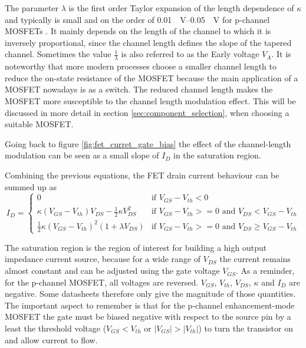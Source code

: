 The parameter $\lambda$ is the first order Taylor expansion of the length dependence of $\kappa$ and typically is small and on the order of \qtyrange[range-units = single, per-mode=power]{0.01}{0.05}{\per \volt} for p-channel MOSFETs \citep[p. 23]{mosfet_flicker_noise}. It mainly depends on the length of the channel to which it is inversely proportional, since the channel length defines the slope of the tapered channel. Sometimes the value $\frac{1}{\lambda}$ is also referred to as the Early voltage $V_A$. It is noteworthy that more modern processes choose a smaller channel length to reduce the on-state resistance of the MOSFET because the main application of a MOSFET nowadays is as a switch. The reduced channel length makes the MOSFET more susceptible to the channel length modulation effect. This will be discussed in more detail in section \ref{sec:component_selection}, when choosing a suitable MOSFET.

Going back to figure \ref{fig:fet_curret_gate_bias} the effect of the channel-length modulation can be seen as a small slope of $I_D$ in the saturation region.

Combining the previous equations, the FET drain current behaviour can be summed up as
\begin{equation}
    I_D = \begin{cases}
        0 & \text{if } V_{GS} - V_{th} < 0\\
        \kappa (V_{GS} - V_{th}) V_{DS} - \frac 1 2 \kappa V_{DS}^2 & \text{if } V_{GS} - V_{th} >= 0 \text{ and } V_{DS} < V_{GS} - V_{th}\\
        \frac 1 2 \kappa \left(V_{GS} - V_{th} \right)^2 (1 + \lambda V_{DS}) & \text{if } V_{GS} - V_{th} >= 0 \text{ and } V_{DS} \geq V_{GS} - V_{th}
    \end{cases}
    \label{eqn:mosfet_id_large_signal}
\end{equation}

The saturation region is the region of interest for building a high output impedance current source, because for a wide range of $V_{DS}$ the current remains almost constant and can be adjusted using the gate voltage $V_{GS}$. As a reminder, for the p-channel MOSFET, all voltages are reversed. $V_{GS}$, $V_{th}$, $V_{DS}$, $\kappa$ and $I_D$ are negative. Some datasheets therefore only give the magnitude of those quantities. The important aspect to remember is that for the p-channel enhancement-mode MOSFET the gate must be biased negative with respect to the source pin by a least the threshold voltage ($V_{GS} < V_{th}$ or $|V_{GS}| > |V_{th}|$) to turn the transistor on and allow current to flow.

